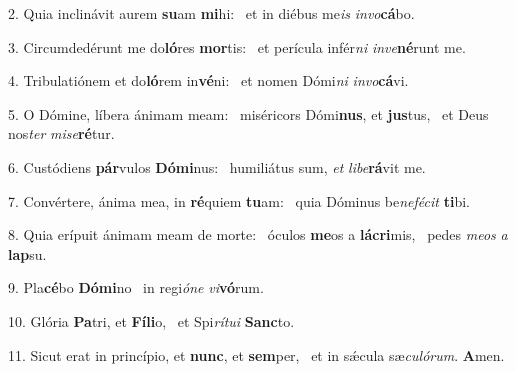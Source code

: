 2. Quia inclinávit aurem \textbf{su}am \textbf{mi}hi: \ast\  et in diébus me\textit{is} \textit{in}\textit{vo}\textbf{cá}bo.\

3. Circumdedérunt me do\textbf{ló}res \textbf{mor}tis: \ast\  et perícula infér\textit{ni} \textit{in}\textit{ve}\textbf{né}runt me.\

4. Tribulatiónem et do\textbf{ló}rem in\textbf{vé}ni: \ast\  et nomen Dómi\textit{ni} \textit{in}\textit{vo}\textbf{cá}vi.\

5. O Dómine, líbera ánimam meam: \dag\  miséricors Dómi\textbf{nus}, et \textbf{jus}tus, \ast\  et Deus nos\textit{ter} \textit{mi}\textit{se}\textbf{ré}tur.\

6. Custódiens \textbf{pár}vulos \textbf{Dó}\textbf{mi}nus: \ast\  humiliátus sum, \textit{et} \textit{li}\textit{be}\textbf{rá}vit me.\

7. Convértere, ánima mea, in \textbf{ré}quiem \textbf{tu}am: \ast\  quia Dóminus be\textit{ne}\textit{fé}\textit{cit} \textbf{ti}bi.\

8. Quia erípuit ánimam meam de morte: \dag\  óculos \textbf{me}os a \textbf{lá}\textbf{cri}mis, \ast\  pedes \textit{me}\textit{os} \textit{a} \textbf{lap}su.\

9. Pla\textbf{cé}bo \textbf{Dó}\textbf{mi}no \ast\  in regi\textit{ó}\textit{ne} \textit{vi}\textbf{vó}rum.\

10. Glória \textbf{Pa}tri, et \textbf{Fí}\textbf{li}o, \ast\  et Spi\textit{rí}\textit{tu}\textit{i} \textbf{Sanc}to.\

11. Sicut erat in princípio, et \textbf{nunc}, et \textbf{sem}per, \ast\  et in sǽcula sæ\textit{cu}\textit{ló}\textit{rum}. \textbf{A}men.\

